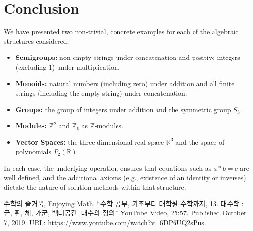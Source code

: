 \documentclass[11pt,openany]{article}
\begin{document}
\section{Conclusion}
We have presented two non-trivial, concrete examples for each of the algebraic structures considered:
\begin{itemize}
	\item \textbf{Semigroups:} non-empty strings under concatenation and positive integers (excluding 1) under multiplication.
	\item \textbf{Monoids:} natural numbers (including zero) under addition and all finite strings (including the empty string) under concatenation.
	\item \textbf{Groups:} the group of integers under addition and the symmetric group \(S_3\).
	\item \textbf{Modules:} \(\mathbb{Z}^2\) and \(\mathbb{Z}_6\) as \(\mathbb{Z}\)-modules.
	\item \textbf{Vector Spaces:} the three-dimensional real space \(\mathbb{R}^3\) and the space of polynomials \(P_2(\mathbb{R})\).
\end{itemize}
In each case, the underlying operation ensures that equations such as \(a\ast b = c\) are well defined, and the additional axioms (e.g., existence of an identity or inverses) dictate the nature of solution methods within that structure.


\begin{thebibliography}{9}
	수학의 즐거움, Enjoying Math. ``수학 공부, 기초부터 대학원 수학까지, 13. 대수학 : 군, 환, 체, 가군, 벡터공간, 대수의 정의'' YouTube Video, 25:57. Published 
	October 7, 2019. URL: \url{https://www.youtube.com/watch?v=6DP6UQ2sPus}.
\end{thebibliography}
\end{document}
